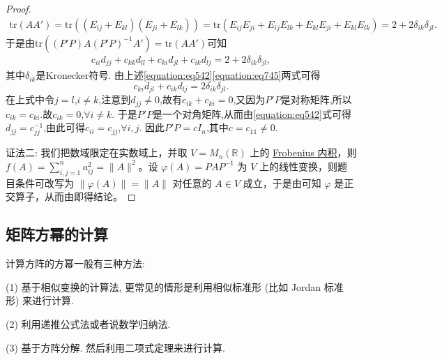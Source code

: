 \documentclass[../../main.tex]{subfiles}%
\begin{document}
\begin{proof}
\begin{align*}
\mathrm{tr}\left( AA' \right) =\mathrm{tr}\left( \left( E_{ij}+E_{kl} \right) \left( E_{ji}+E_{lk} \right) \right) =\mathrm{tr}\left( E_{ij}E_{ji}+E_{ij}E_{lk}+E_{kl}E_{ji}+E_{kl}E_{lk} \right)=2 + 2\delta_{ik}\delta_{jl}.    
\end{align*}
于是由$\text{tr}((P'P)A(P'P)^{-1}A')=\text{tr}(AA')$可知
\begin{align}\label{equation:eq745}
c_{ii}d_{jj}+c_{kk}d_{ll}+c_{ki}d_{jl}+c_{ik}d_{lj}=2 + 2\delta_{ik}\delta_{jl},  
\end{align}
其中\(\delta_{ik}\)是Kronecker符号. 由上述\eqref{equation:eq542}\eqref{equation:eq745}两式可得
\[
c_{ki}d_{jl}+c_{ik}d_{lj}=2\delta_{ik}\delta_{jl}.
\]
在上式中令\(j = l\),\(i\neq k\),注意到\(d_{jj}\neq0\),故有\(c_{ik}+c_{ki}=0\),又因为\(P'P\)是对称矩阵,所以\(c_{ik}=c_{ki}\).故\(c_{ik}=0\),\(\forall i\neq k\). 于是\(P'P\)是一个对角矩阵,从而由\eqref{equation:eq542}式可得\(d_{jj}=c_{jj}^{-1}\),由此可得\(c_{ii}=c_{jj}\),\(\forall i,j\). 因此\(P'P = cI_n\),其中\(c = c_{11}\neq0\).

{\color{blue}证法二:}
我们把数域限定在实数域上，并取 \(V = M_n(\mathbb{R})\) 上的 \hyperlink{Frobenius 内积}{Frobenius 内积}，则 \(f(A)=\sum_{i,j = 1}^{n}a_{ij}^2=\|A\|^2\)。设 \(\varphi(A)=PAP^{-1}\) 为 \(V\) 上的线性变换，则题目条件可改写为 \(\|\varphi(A)\|=\|A\|\) 对任意的 \(A\in V\) 成立，于是由可知 \(\varphi\) 是正交算子，从而由即得结论。

\end{proof}


\subsection{矩阵方幂的计算}

计算方阵的方幂一般有三种方法:

(1) 基于相似变换的计算法, 更常见的情形是利用相似标准形 (比如 Jordan 标准形) 来进行计算.

(2) 利用递推公式法或者说数学归纳法.

(3) 基于方阵分解. 然后利用二项式定理来进行计算.
\end{document}
